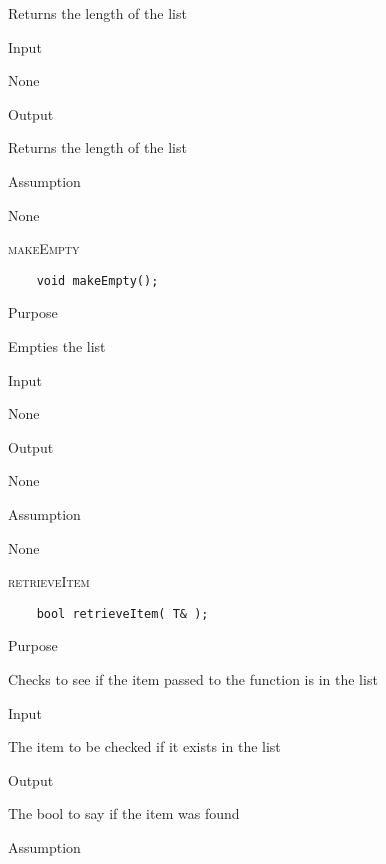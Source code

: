 \documentclass[pdftex, 11pt]{article}
\begin{document}
\begin{description}
\begin{description}
				Returns the length of the list

			\item{Input}

				None

			\item{Output}

				Returns the length of the list

			\item{Assumption}

				None

		\end{description}

	\item{\textsc{makeEmpty}}
\begin{lstlisting}
	void makeEmpty();
\end{lstlisting}

		\begin{description}

			\item{Purpose}

				Empties the list

			\item{Input}

				None

			\item{Output}

				None
			\item{Assumption}

				None

		\end{description}

	\item{\textsc{retrieveItem}}
\begin{lstlisting}
	bool retrieveItem( T& );
\end{lstlisting}

		\begin{description}

			\item{Purpose}

				Checks to see if the item passed to the function is in the list

			\item{Input}

				The item to be checked if it exists in the list

			\item{Output}

				The bool to say if the item was found

			\item{Assumption}


\end{description}
\end{description}
\end{document}
